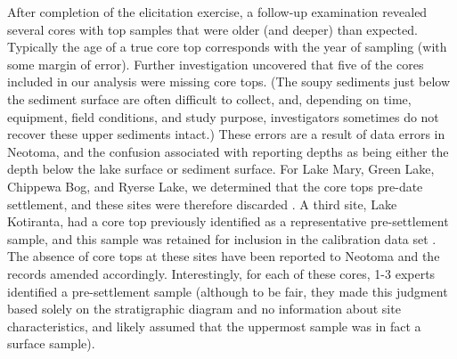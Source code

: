 \documentclass[12pt]{article}
\begin{document}
After completion of the elicitation exercise, a follow-up examination
revealed several cores with top samples that were older (and deeper)
than expected. Typically the age of a true core top corresponds with
the year of sampling (with some margin of error). Further
investigation uncovered that five of the cores included in our
analysis were missing core tops. (The soupy sediments just below the
sediment surface are often difficult to collect, and, depending on
time, equipment, field conditions, and study purpose, investigators
sometimes do not recover these upper sediments intact.) These errors
are a result of data errors in Neotoma, and the confusion associated
with reporting depths as being either the depth below the lake surface
or sediment surface. For Lake Mary, Green Lake, Chippewa Bog, and
Ryerse Lake, we determined that the core tops pre-date settlement, and
these sites were therefore discarded \citep{webb1971late,
  lawrenz1975}. A third site, Lake Kotiranta, had a core top
previously identified as a representative pre-settlement sample, and
this sample was retained for inclusion in the calibration data set
\citep{wright1969}. The absence of core tops at these sites have been
reported to Neotoma and the records amended
accordingly. Interestingly, for each of these cores, 1-3 experts
identified a pre-settlement sample (although to be fair, they made
this judgment based solely on the stratigraphic diagram and no
information about site characteristics, and likely assumed that the
uppermost sample was in fact a surface sample).

\end{document}
